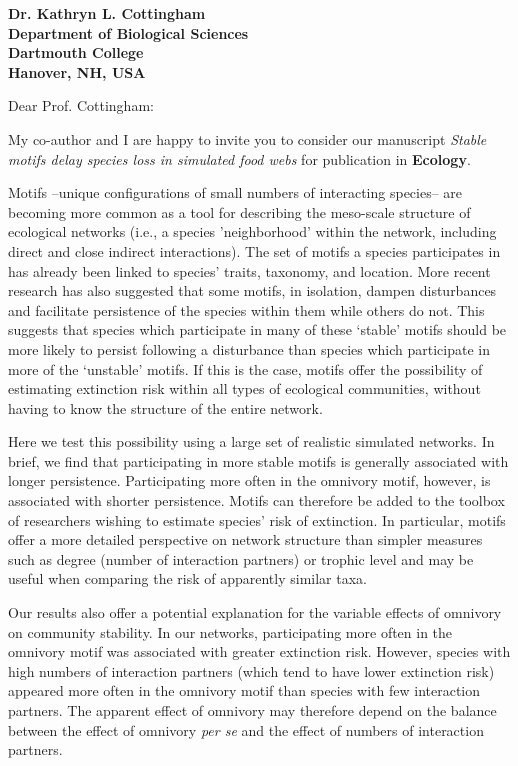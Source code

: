 \documentclass[12pt]{letter}
\begin{document}
\begin{letter}{\bf Dr. Kathryn L. Cottingham \\
Department of Biological Sciences \\
Dartmouth College \\
Hanover, NH, USA}


\opening{Dear Prof. Cottingham:}

  My co-author and I are happy to invite you to consider our manuscript
  \emph{Stable motifs delay species loss in simulated food webs} for publication in \textbf{Ecology}.


	Motifs --unique configurations of small numbers of interacting species-- are becoming more common as a tool for describing the meso-scale structure of ecological networks (i.e., a species 'neighborhood' within the network, including direct and close indirect interactions). 
	The set of motifs a species participates in has already been linked to species' traits, taxonomy, and location.
	More recent research has also suggested that some motifs, in isolation, dampen disturbances and facilitate persistence of the species within them while others do not.
	This suggests that species which participate in many of these `stable' motifs should be more likely to persist following a disturbance than species which participate in more of the `unstable' motifs.
	If this is the case, motifs offer the possibility of estimating extinction risk within all types of ecological communities, without having to know the structure of the entire network.


	Here we test this possibility using a large set of realistic simulated networks. In brief, we find that participating in more stable motifs is generally associated with longer persistence. Participating more often in the omnivory motif, however, is associated with shorter persistence. Motifs can therefore be added to the toolbox of researchers wishing to estimate species' risk of extinction. In particular, motifs offer a more detailed perspective on network structure than simpler measures such as degree (number of interaction partners) or trophic level and may be useful when comparing the risk of apparently similar taxa.


 	Our results also offer a potential explanation for the variable effects of omnivory on community stability. In our networks, participating more often in the omnivory motif was associated with greater extinction risk. However, species with high numbers of interaction partners (which tend to have lower extinction risk) appeared more often in the omnivory motif than species with few interaction partners. The apparent effect of omnivory may therefore depend on the balance between the effect of omnivory \emph{per se} and the effect of numbers of interaction partners.



\end{letter}
\end{document}
